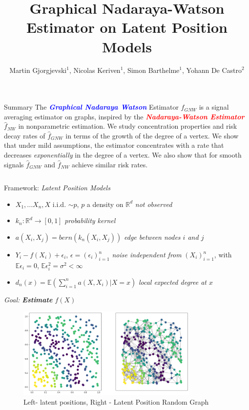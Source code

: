 \documentclass[final,dvipsnames]{beamer}
\title{Graphical Nadaraya-Watson Estimator on Latent Position Models}
\author{Martin Gjorgjevski$^1$, Nicolas Keriven$^1$, Simon Barthelme$^1$, Yohann De Castro$^2$}
\institute{$^1$CNRS Gipsa-Lab, Grenoble, $^2$CNRS Ecole Centrale Lyon, Lyon}
\newcommand{\myemphh}[1]{\textbf{\textcolor{blue}{#1}}}
\newcommand{\myemphr}[1]{\textbf{\textcolor{red}{#1}}}
\newcommand{\mycolbackgreen}[1]{
\hspace*{.01\linewidth}\begin{minipage}{.35\linewidth}
\begin{mdframed}[backgroundcolor=green!10,linewidth=1pt]
\vspace{10pt}
#1
\vspace{10pt}
\end{mdframed}
\end{minipage}
}
\begin{document}
\begin{frame}

\begin{block}{Summary}
    The \textit{\myemphh{Graphical Nadaraya Watson}} Estimator $\hat{f}_{GNW}$ is a signal averaging estimator on graphs, inspired by the \textit{\myemphr{Nadaraya-Watson Estimator}} $\hat{f}_{NW}$ in nonparametric estimation. 
    We study concentration properties and risk decay rates of $\hat{f}_{GNW}$ in terms of the growth of the degree of a vertex. We show that under mild assumptions, the estimator concentrates with a rate that decreases
    \textit{exponentially} in the degree of a vertex. We also show that for smooth signals $\hat{f}_{GNW}$ and $\hat{f}_{NW}$ achieve similar risk rates.    
\end{block}    

\begin{columns}[T]

    

\begin{column}{0.48\textwidth}
\begin{block}{Framework: \textit{Latent Position Models}}
\vspace{20pt}
\begin{itemize}
\item $X_1,...X_n,X$ i.i.d. $\sim p$, $p$ a density on $\mathbb{R}^d$
\textit{not observed}
\vspace{10pt}
\item $k_n:\mathbb{R}^d\to [0,1]$ \textit{probability kernel} 
\vspace{10pt}
\item $a(X_i,X_j)=bern(k_n(X_i,X_j))$ \textit{edge between nodes $i$ and $j$}
\vspace{10pt}
\item $Y_i-f(X_i)+\epsilon_i$, $\epsilon=(\epsilon_i)_{i=1}^n$ \textit{noise independent from} $(X_i)_{i=1}^n$, with $\mathbb{E}\epsilon_i=0$, $\mathbb{E}\epsilon_i^2
=\sigma^2<\infty$ 
\vspace{10pt}
\item $d_n(x)=\mathbb{E}(\sum_{i=1}^n a(X,X_i)|X=x)$ \textit{local expected degree at $x$}
\end{itemize}
\vspace{20pt}
\mycolbackgreen{
    \textit{Goal: \textbf{Estimate} $f(X)$}
}
\begin{figure}
    \centering
    \includegraphics[width=0.8\textwidth]{lpm_image_correct.png}
    \caption{Left- latent positions, Right - Latent Position Random Graph}
    \label{fig:my_label}
    \end{figure}



\end{block}
\end{column}
\end{columns}
\end{frame}
\end{document}
